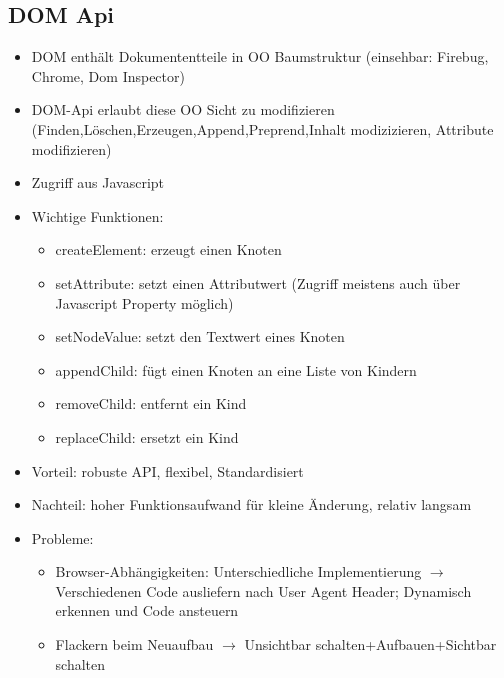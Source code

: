 \documentclass{article} %
\begin{document}
	\subsection{DOM Api}
	\begin{itemize}
		\item DOM enthält Dokumententteile in OO Baumstruktur (einsehbar: Firebug, Chrome, Dom Inspector)
		\item DOM-Api erlaubt diese OO Sicht zu modifizieren (Finden,Löschen,Erzeugen,Append,Preprend,Inhalt modizizieren, Attribute modifizieren)
		\item Zugriff aus Javascript
		\item Wichtige Funktionen:
		\begin{itemize}
			\item createElement: erzeugt einen Knoten
			\item setAttribute: setzt einen Attributwert (Zugriff meistens auch über Javascript Property möglich)
			\item setNodeValue: setzt den Textwert eines Knoten
			\item appendChild: fügt einen Knoten an eine Liste von Kindern
			\item removeChild: entfernt ein Kind
			\item replaceChild: ersetzt ein Kind
		\end{itemize}
		\item Vorteil: robuste API, flexibel, Standardisiert
		\item Nachteil: hoher Funktionsaufwand für kleine Änderung, relativ langsam 
		\item Probleme:
		\begin{itemize}
			\item Browser-Abhängigkeiten: Unterschiedliche Implementierung $\rightarrow$ Verschiedenen Code ausliefern nach User Agent Header; Dynamisch erkennen und Code ansteuern
			\item Flackern beim Neuaufbau $\rightarrow$ Unsichtbar schalten+Aufbauen+Sichtbar schalten
		\end{itemize}
	\end{itemize}
\end{document}
